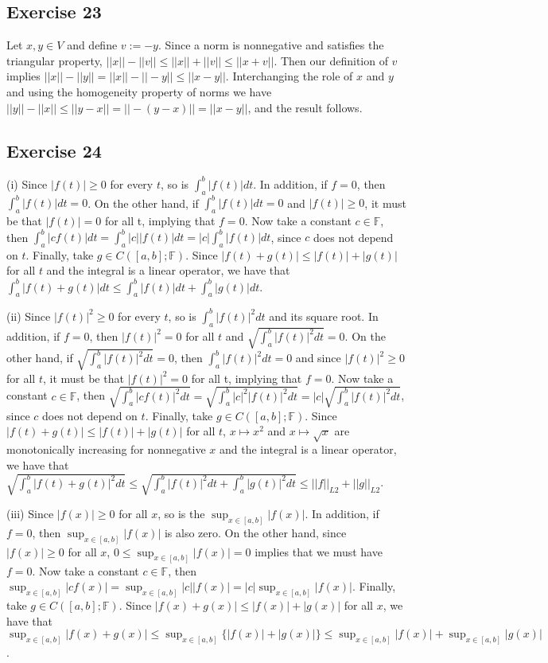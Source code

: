 \documentclass[11.5pt, letterpaper, bibtotoc,
    tablecaptionabove, figurecaptionabove]{article}
\begin{document}
\subsection*{Exercise 23}
Let $x,y\in V$ and define $v:=-y$.
Since a norm is nonnegative and satisfies the triangular property, 
$||x||-||v||\leq ||x||+||v||\leq||x+v||$.
Then our definition of $v$ implies $||x||-||y||=||x||-||-y||\leq||x-y||$.
Interchanging the role of $x$ and $y$ and using the homogeneity property of norms we have
$||y||-||x||\leq||y-x||=||-(y-x)||=||x-y||$,
and the result follows.

\subsection*{Exercise 24}
(i)
Since $|f(t)|\geq 0$ for every $t$, so is $\int_a^b|f(t)|dt$.
In addition, if $f=0$, then $\int_a^b|f(t)|dt=0$.
On the other hand, if $\int_a^b|f(t)|dt=0$ and $|f(t)|\geq 0$, it must be that
$|f(t)|=0$ for all t, implying that $f=0$.
Now take a constant $c\in\mathbb F$, then 
$\int_a^b|cf(t)|dt=\int_a^b|c||f(t)|dt=|c|\int_a^b|f(t)|dt$,
since $c$ does not depend on $t$.
Finally, take $g\in C([a, b]; \mathbb F)$.
Since $|f(t)+g(t)|\leq|f(t)|+|g(t)|$ for all $t$ and the integral is a linear operator,
we have that $\int_a^b|f(t)+g(t)|dt\leq\int_a^b|f(t)|dt + \int_a^b|g(t)|dt$.

(ii)
Since $|f(t)|^2\geq 0$ for every $t$, so is $\int_a^b|f(t)|^2dt$ and its square root.
In addition, if $f=0$, then $|f(t)|^2=0$ for all $t$ and $\sqrt{\int_a^b|f(t)|^2dt}=0$.
On the other hand, if $\sqrt{\int_a^b|f(t)|^2dt}=0$, 
then $\int_a^b|f(t)|^2dt=0$ and since $|f(t)|^2\geq 0$ for all $t$, 
it must be that $|f(t)|^2=0$ for all t, implying that $f=0$.
Now take a constant $c\in\mathbb F$, then 
$\sqrt{\int_a^b|cf(t)|^2dt}=\sqrt{\int_a^b|c|^2|f(t)|^2dt}=|c|\sqrt{\int_a^b|f(t)|^2dt}$,
since $c$ does not depend on $t$.
Finally, take $g\in C([a, b]; \mathbb F)$.
Since $|f(t)+g(t)|\leq|f(t)|+|g(t)|$ for all $t$, 
$x\mapsto x^2$ and $x\mapsto\sqrt{x}$ are monotonically increasing for nonnegative $x$ 
and the integral is a linear operator,
we have that $\sqrt{\int_a^b|f(t)+g(t)|^2dt}\leq\sqrt{\int_a^b|f(t)|^2dt + \int_a^b|g(t)|^2dt}
\leq||f||_{L2}+||g||_{L2}$.

(iii)
Since $|f(x)|\geq 0$ for all $x$, so is the $\sup_{x\in[a, b]}|f(x)|$.
In addition, if $f=0$, then $\sup_{x\in[a, b]}|f(x)|$ is also zero.
On the other hand, since $|f(x)|\geq 0$ for all $x$, $0\leq\sup_{x\in[a, b]}|f(x)|=0$
implies that we must have $f=0$.
Now take a constant $c\in\mathbb F$, then
$\sup_{x\in[a, b]}|cf(x)|=\sup_{x\in[a, b]}|c||f(x)|=|c|\sup_{x\in[a, b]}|f(x)|$.
Finally, take $g\in C([a, b];\mathbb F)$.
Since $|f(x)+g(x)|\leq|f(x)|+|g(x)|$ for all $x$, we have that
$\sup_{x\in[a, b]}|f(x)+g(x)|\leq\sup_{x\in[a, b]}\{|f(x)|+|g(x)|\}
\leq\sup_{x\in[a, b]}|f(x)|+\sup_{x\in[a, b]}|g(x)|$.
\end{document}
